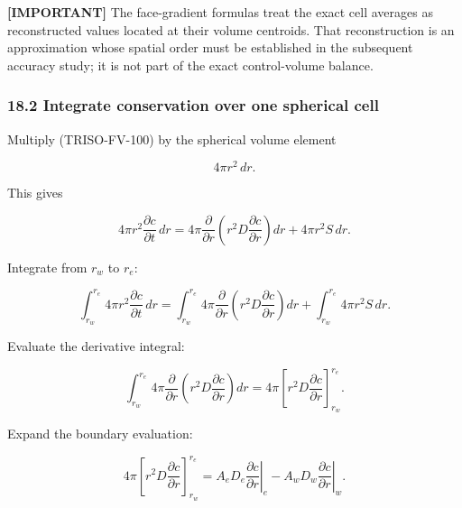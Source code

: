 \documentclass[11pt,a4paper]{article}
\begin{document}
\textbf{[IMPORTANT]} The face-gradient formulas treat the exact cell averages as reconstructed values located at their volume centroids. That reconstruction is an approximation whose spatial order must be established in the subsequent accuracy study; it is not part of the exact control-volume balance.

\subsubsection*{18.2 Integrate conservation over one spherical cell}

Multiply (TRISO-FV-100) by the spherical volume element

\begin{equation}
4\pi r^2\,dr.
\tag{TRISO-FV-109}
\label{eq:triso-fv-109}
\end{equation}

This gives

\begin{equation}
4\pi r^2
\frac{\partial c}{\partial t}\,dr
=
4\pi
\frac{\partial}{\partial r}
\left(
r^2D\frac{\partial c}{\partial r}
\right)dr
+
4\pi r^2S\,dr.
\tag{TRISO-FV-110}
\label{eq:triso-fv-110}
\end{equation}

Integrate from $r_w$ to $r_e$:

\begin{equation}
\int_{r_w}^{r_e}
4\pi r^2
\frac{\partial c}{\partial t}\,dr
=
\int_{r_w}^{r_e}
4\pi
\frac{\partial}{\partial r}
\left(
r^2D\frac{\partial c}{\partial r}
\right)dr
+
\int_{r_w}^{r_e}
4\pi r^2S\,dr.
\tag{TRISO-FV-111}
\label{eq:triso-fv-111}
\end{equation}

Evaluate the derivative integral:

\begin{equation}
\int_{r_w}^{r_e}
4\pi
\frac{\partial}{\partial r}
\left(
r^2D\frac{\partial c}{\partial r}
\right)dr
=
4\pi
\left[
r^2D\frac{\partial c}{\partial r}
\right]_{r_w}^{r_e}.
\tag{TRISO-FV-112}
\label{eq:triso-fv-112}
\end{equation}

Expand the boundary evaluation:

\begin{equation}
4\pi
\left[
r^2D\frac{\partial c}{\partial r}
\right]_{r_w}^{r_e}
=
A_eD_e
\left.\frac{\partial c}{\partial r}\right|_e
-
A_wD_w
\left.\frac{\partial c}{\partial r}\right|_w.
\tag{TRISO-FV-113}
\label{eq:triso-fv-113}
\end{equation}
\end{document}

